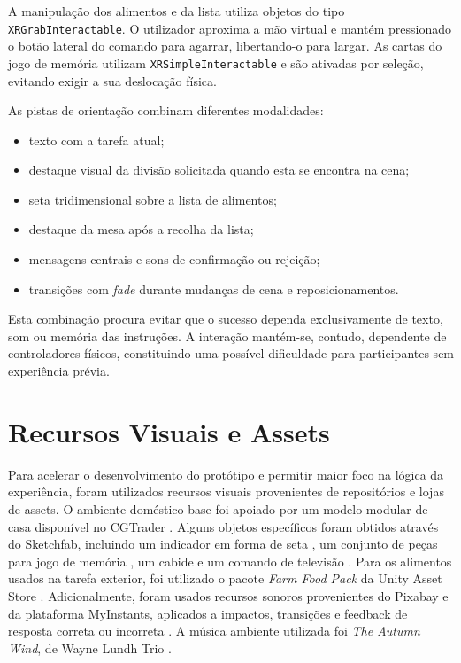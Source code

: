 \documentclass[12pt,a4paper,oneside]{report}
\begin{document}
A manipulação dos alimentos e da lista utiliza objetos do tipo \texttt{XRGrabInteractable}. O utilizador aproxima a mão virtual e mantém pressionado o botão lateral do comando para agarrar, libertando-o para largar. As cartas do jogo de memória utilizam \texttt{XRSimpleInteractable} e são ativadas por seleção, evitando exigir a sua deslocação física.

As pistas de orientação combinam diferentes modalidades:

\begin{itemize}
    \item texto com a tarefa atual;
    \item destaque visual da divisão solicitada quando esta se encontra na cena;
    \item seta tridimensional sobre a lista de alimentos;
    \item destaque da mesa após a recolha da lista;
    \item mensagens centrais e sons de confirmação ou rejeição;
    \item transições com \textit{fade} durante mudanças de cena e reposicionamentos.
\end{itemize}

Esta combinação procura evitar que o sucesso dependa exclusivamente de texto, som ou memória das instruções. A interação mantém-se, contudo, dependente de controladores físicos, constituindo uma possível dificuldade para participantes sem experiência prévia.

\section{Recursos Visuais e Assets}

Para acelerar o desenvolvimento do protótipo e permitir maior foco na lógica da experiência, foram utilizados recursos visuais provenientes de repositórios e lojas de assets. O ambiente doméstico base foi apoiado por um modelo modular de casa disponível no CGTrader \cite{cgtraderhouse}. Alguns objetos específicos foram obtidos através do Sketchfab, incluindo um indicador em forma de seta \cite{sketchfabarrow}, um conjunto de peças para jogo de memória \cite{sketchfabmemory}, um cabide \cite{sketchfabcoathanger} e um comando de televisão \cite{sketchfabremote}. Para os alimentos usados na tarefa exterior, foi utilizado o pacote \textit{Farm Food Pack} da Unity Asset Store \cite{unityfarmfood}. Adicionalmente, foram usados recursos sonoros provenientes do Pixabay e da plataforma MyInstants, aplicados a impactos, transições e feedback de resposta correta ou incorreta \cite{soundswooshsuave,soundthudheavy,soundvaseimpact,soundpanhit,soundcorrect,soundwrong,soundduolingocorrect,soundduolingowrong}. A música ambiente utilizada foi \textit{The Autumn Wind}, de Wayne Lundh Trio \cite{theautumnwind}.
\end{document}
